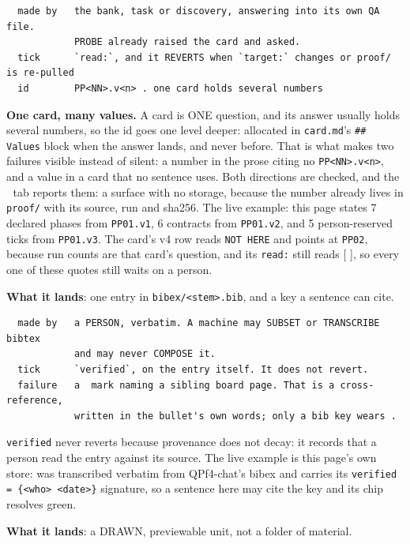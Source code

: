 \begin{verbatim}
  made by   the bank, task or discovery, answering into its own QA file.
            PROBE already raised the card and asked.
  tick      `read:`, and it REVERTS when `target:` changes or proof/ is re-pulled
  id        PP<NN>.v<n> . one card holds several numbers
\end{verbatim}
\textbf{One card, many values.} A card is ONE question, and its answer usually holds several numbers, so the id goes one level deeper: allocated in \texttt{card.md}'s \texttt{\#\# Values} block when the answer lands, and never before. That is what makes two failures visible instead of silent: a number in the prose citing no \texttt{PP<NN>.v<n>}, and a value in a card that no sentence uses. Both directions are checked, and the 🔢 tab reports them: a surface with no storage, because the number already lives in \texttt{proof/} with its source, run and sha256. The live example: this page states 7 declared phases from \texttt{PP01.v1}, 6 contracts from \texttt{PP01.v2}, and 5 person-reserved ticks from \texttt{PP01.v3}. The card's v4 row reads \texttt{NOT HERE} and points at \texttt{PP02}, because run counts are that card's question, and its \texttt{read:} still reads [ ], so every one of these quotes still waits on a person.

\textbf{What it lands}: one entry in \texttt{bibex/<stem>.bib}, and a key a sentence can cite.

\begin{verbatim}
  made by   a PERSON, verbatim. A machine may SUBSET or TRANSCRIBE bibtex
            and may never COMPOSE it.
  tick      `verified`, on the entry itself. It does not revert.
  failure   a  mark naming a sibling board page. That is a cross-reference,
            written in the bullet's own words; only a bib key wears .
\end{verbatim}
\texttt{verified} never reverts because provenance does not decay: it records that a person read the entry against its source. The live example is this page's own store: \citep{luo2026eventglucose} was transcribed verbatim from QPf4-chat's bibex and carries its \texttt{verified = \{<who> <date>\}} signature, so a sentence here may cite the key and its chip resolves green.

\textbf{What it lands}: a DRAWN, previewable unit, not a folder of material.

